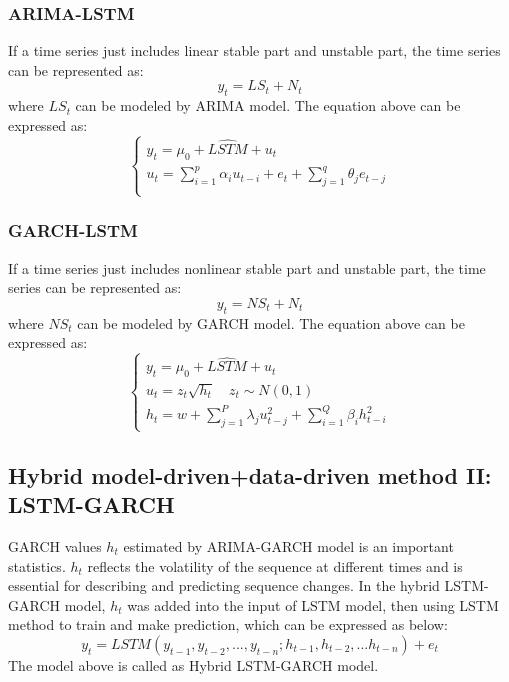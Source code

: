 \subsubsection{ARIMA-LSTM}
\vspace{-0.10in}
If a time series just includes linear stable part and unstable part, the time series can be represented as:
\begin{equation}
     y_t = LS_t +  N_t
\end{equation}
where $LS_t$ can be modeled by ARIMA model. The equation above can be expressed as:
\begin{equation}
\begin{cases}
    y_t = \mu_0 + \widehat{LSTM} + u_t\\
    u_t = \sum_{i=1}^{p} {\alpha_i{u_{t-i}}} + e_t+ \sum_{j=1}^{q} {\theta_j{e_{t-j}}}\\
\end{cases}
\end{equation}
\subsubsection{GARCH-LSTM}
\vspace{-0.10in}
If a time series just includes nonlinear stable part and unstable part, the time series can be represented as:
\begin{equation}
     y_t = NS_t +  N_t
\end{equation}
where $NS_t$ can be modeled by GARCH model. The equation above can be expressed as:
\begin{equation}
    \begin{cases}
      y_t = \mu_0 +\widehat{LSTM}+ u_t \\
      u_t = z_t{\sqrt{h_t}}\quad z_t\sim N(0,1)\\
      h_t = w+\sum_{j=1}^{P} {\lambda_j{u_{t-j}^2}}+\sum_{i=1}^{Q}{\beta_i{h_{t-i}^2}}
    \end{cases}
\end{equation}
\subsection{Hybrid model-driven+data-driven method II: LSTM-GARCH}
 GARCH values $h_t$ estimated by ARIMA-GARCH model is an important statistics. $h_t$ reflects the volatility of the sequence at different times and is essential for describing and predicting sequence changes. In the hybrid LSTM-GARCH model, $h_t$ was added into the input of LSTM model, then using LSTM method to train and make prediction, which can be expressed as below:
\begin{equation}
                                                        y_t = LSTM(y_{t-1},y_{t-2},...,y_{t-n};h_{t-1},h_{t-2},...h_{t-n}) + e_t
\end{equation}
The model above is called as Hybrid LSTM-GARCH model.
